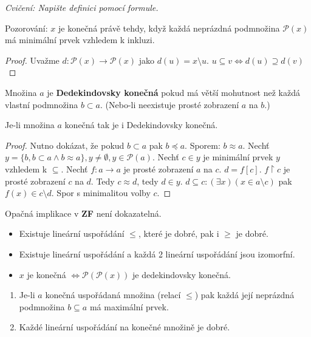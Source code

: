 \textit{Cvičení: Napište definici pomocí formule.}

Pozorování: $x$ je konečná právě tehdy, když každá neprázdná podmnožina $\mathcal{P}(x)$ má minimální prvek vzhledem k inkluzi.

\begin{proof}
	Uvažme $d: \mathcal{P}(x) \to \mathcal{P}(x)$ jako $d(u) = x \setminus u$. $u \subseteq v \Leftrightarrow d(u) \supseteq d(v)$
\end{proof}

\begin{definice}
	Množina $a$ je \textbf{Dedekindovsky konečná} pokud má větší mohutnost než každá vlastní podmnožina $b \subset a$. (Nebo-li neexistuje prosté zobrazení $a$ na $b$.)
\end{definice}

\begin{lemma}
	Je-li množina $a$ konečná tak je i Dedekindovsky konečná.
\end{lemma}

\begin{proof}
	Nutno dokázat, že pokud $b \subset a$ pak $b \preceq a$. Sporem: $b \approx a$. Nechť $y = \{b, b \subset a \land b \approx a\}, y \neq \emptyset, y \in \mathcal{P}(a)$. Nechť $c \in y$ je minimální prvek $y$ vzhledem k $\subseteq$. Nechť $f: a \to a$ je prosté zobrazení $a$ na $c$. $d = f[c]$. $f \upharpoonright c$ je prosté zobrazení $c$ na $d$. Tedy $c \approx d$, tedy $d \in y$. $d \subseteq c: (\exists x)( x \in a \setminus c)$ pak $f(x) \in c \setminus d$. Spor s minimalitou volby $c$.
\end{proof}

\begin{pozn}
	Opačná implikace v \textbf{ZF} není dokazatelná.
\end{pozn}


\begin{itemize}
	\item Existuje lineární uspořádání $\leq$, které je dobré, pak i $\geq$ je dobré.
	\item Existuje lineární uspořádání a každá 2 lineární uspořádání jsou izomorfní.
	\item $x$ je konečná $\Leftrightarrow \mathcal{P}(\mathcal{P}(x))$ je dedekindovsky konečná.
\end{itemize}

\begin{thm}
	\begin{enumerate}
		\item Je-li $a$ konečná uspořádaná množina (relací $\leq$) pak každá její neprázdná podmnožina $b \subseteq a$ má maximální prvek.
		\item Každé lineární uspořádání na konečné množině je dobré.
	\end{enumerate}
\end{thm}

